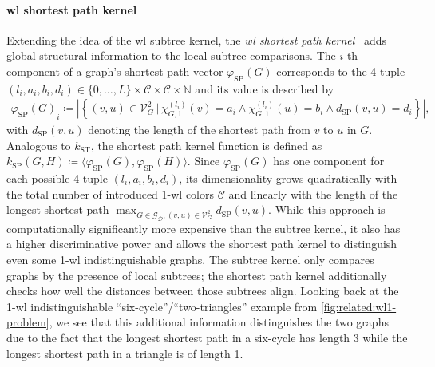 \paragraph{\ac{wl} shortest path kernel}
Extending the idea of the \ac{wl} subtree kernel, the \textit{\ac{wl} shortest path kernel}~\cite{Shervashidze2011}\cite{Borgwardt2005} adds global structural information to the local subtree comparisons.
The $i$-th component of a graph's shortest path vector $\varphi_{\text{SP}}(G)$ corresponds to the 4-tuple $(l_i, a_i, b_i, d_i) \in {\{ 0, \dots, L \}} \times \mathcal{C} \times \mathcal{C} \times \mathbb{N}$ and its value is described by
\begin{align}
	{\varphi_{\text{SP}}(G)}_i \coloneqq \left| \left\{ (v, u) \in \mathcal{V}_G^2 \,|\, {\chi_{G,1}^{(l_i)}(v) = a_i} \land {\chi_{G,1}^{(l_i)}(u) = b_i} \land {d_{\text{SP}}(v, u) = d_i} \right\} \right| \text{,} %
\end{align}
with $d_{\text{SP}}(v, u)$ denoting the length of the shortest path from $v$ to $u$ in $G$.
Analogous to $k_{\text{ST}}$, the shortest path kernel function is defined as $k_{\text{SP}}(G, H) \coloneqq \langle \varphi_{\text{SP}}(G), \varphi_{\text{SP}}(H) \rangle$.
Since $\varphi_{\text{SP}}(G)$ has one component for each possible 4-tuple $(l_i, a_i, b_i, d_i)$, its dimensionality grows quadratically with the total number of introduced 1-\acs{wl} colors $\mathcal{C}$ and linearly with the length of the longest shortest path $\max_{G \in \mathcal{G}_{\mathcal{D}}, (v, u) \in \mathcal{V}_G^2} d_{\text{SP}}(v, u)$.
While this approach is computationally significantly more expensive than the subtree kernel, it also has a higher discriminative power and allows the shortest path kernel to distinguish even some 1-\acs{wl} indistinguishable graphs.
The subtree kernel only compares graphs by the presence of local subtrees;
the shortest path kernel additionally checks how well the distances between those subtrees align.
Looking back at the 1-\acs{wl} indistinguishable ``six-cycle''/``two-triangles'' example from \cref{fig:related:wl1-problem}, we see that this additional information distinguishes the two graphs due to the fact that the longest shortest path in a six-cycle has length 3 while the longest shortest path in a triangle is of length 1.

